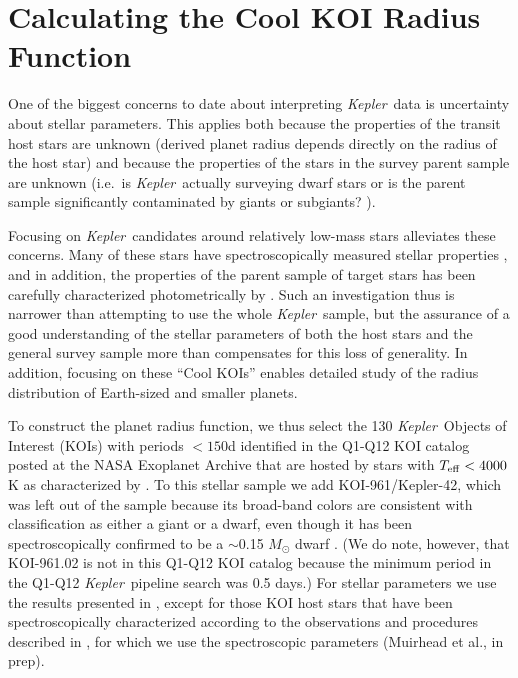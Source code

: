 \documentclass[iop]{emulateapj}
\def\Kepler{\textit{Kepler}}
\def\Pmax{150}
\begin{document}
\section{Calculating the Cool KOI Radius Function}
\label{sec:calculation}

One of the biggest concerns to date about interpreting \Kepler\ data is uncertainty about stellar parameters.  This applies both because the properties of the transit host stars are unknown (derived planet radius depends directly on the radius of the host star) and because the properties of the stars in the survey parent sample are unknown (i.e.~is \Kepler\ actually surveying dwarf stars or is the parent sample significantly contaminated by giants or subgiants? \citep{mann2012}).  




Focusing on \Kepler\ candidates around relatively low-mass stars alleviates these concerns.  Many of these stars have spectroscopically measured stellar properties \citep{muirhead2012b,mann2012}, and in addition, the properties of the parent sample of target stars has been carefully characterized photometrically by \citet{dressing2013}.  Such an investigation thus is narrower than attempting to use the whole \Kepler\ sample, but the assurance of a good understanding of the stellar parameters of both the host stars and the general survey sample more than compensates for this loss of generality.  In addition, focusing on these ``Cool KOIs'' enables detailed study of the radius distribution of Earth-sized and smaller planets.  

To construct the planet radius function, we thus select the 130 \Kepler\ Objects of Interest (KOIs) with periods $<$$\Pmax$d  identified in the  Q1-Q12 KOI catalog posted at the NASA Exoplanet Archive that are hosted by stars with $T_{\rm eff} < 4000$K as characterized by \citet{dressing2013}.  To this stellar sample we add KOI-961/Kepler-42, which was left out of the \citet{dressing2013} sample because its broad-band colors are consistent with classification
as either a giant or a dwarf, even though it has been spectroscopically confirmed to be a $\sim$0.15 $M_\odot$ dwarf \citep{muirhead2012a}.   (We do note, however, that KOI-961.02 is not in this Q1-Q12 KOI catalog because the minimum period in the Q1-Q12 \Kepler\ pipeline search was 0.5 days.)  
For stellar parameters we use the results presented in \citet{dressing2013}, except for those KOI host stars that have been spectroscopically characterized according to the observations and procedures described in  \citet{muirhead2012a}, for which we use the spectroscopic parameters (Muirhead et al., in prep).  
\end{document}
